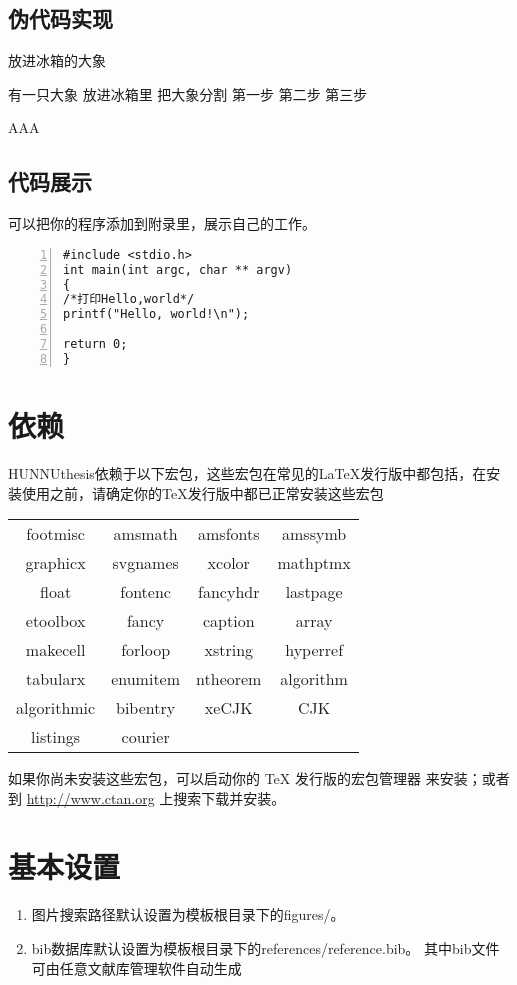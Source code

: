 \subsection{伪代码实现}
\begin{algorithm}
\caption{放进冰箱的大象}\label{算法实例}
\begin{algorithmic}
	\REQUIRE 有一只大象
	\ENSURE 放进冰箱里
	\STATE 把大象分割
	\ENDIF
	\ENDFOR
	\STATE 第一步
	\STATE 第二步
	\STATE 第三步
\end{algorithmic}
AAA\end{algorithm}
\subsection{代码展示}
可以把你的程序添加到附录里，展示自己的工作。
\begin{lstlisting}[language={[ANSI]C}, numbers=left]
#include <stdio.h>
int main(int argc, char ** argv)
{
/*打印Hello,world*/
printf("Hello, world!\n");

return 0;
}
\end{lstlisting}
\section{依赖}
HUNNUthesis依赖于以下宏包，这些宏包在常见的\LaTeX{}发行版中都包括，在安装使用之前，请确定你的\TeX{}发行版中都已正常安装这些宏包
\begin{table}[H]
	\centering
	\begin{tabular}{cccc}
		\hline
		{footmisc} &  {amsmath} &  {amsfonts} &  {amssymb} \\
		
		{graphicx} &  {svgnames} &  {xcolor} &  {mathptmx} \\
		
		{float} &  {fontenc} &  {fancyhdr} &  {lastpage} \\
		
		{etoolbox} &  {fancy} &  {caption} &  {array} \\
		
		{makecell} &  {forloop} &  {xstring} &  {hyperref} \\
		
		{tabularx} &  {enumitem} &  {ntheorem} &  {algorithm}\\
		
		{algorithmic} &  {bibentry} &  {xeCJK} &  {CJK} \\
		{listings} &  {courier} &  {} &  {} \\
		\hline
	\end{tabular}
\end{table}
如果你尚未安装这些宏包，可以启动你的 \TeX{} 发行版的宏包管理器
来安装；或者到 \url{http://www.ctan.org} 上搜索下载并安装。
\section{基本设置}
\begin{enumerate}
	\item 图片搜索路径默认设置为模板根目录下的figures/。
	\item bib数据库默认设置为模板根目录下的references/reference.bib。 其中bib文件可由任意文献库管理软件自动生成
\end{enumerate}

